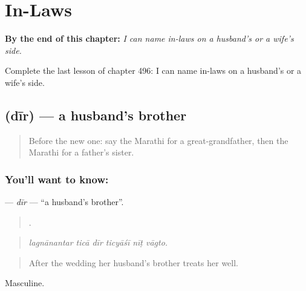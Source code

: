 
\chapter{In-Laws}
\label{ch:mr-in-laws}

\begin{chapteropening}
\textbf{By the end of this chapter:} \emph{I can name in-laws on a husband's or a wife's side.}

Complete the last lesson of chapter 496: I can name in-laws on a husband's or a wife's side.
\end{chapteropening}

\section[\texorpdfstring{\mr{दीर} (dīr)}{दीर (dīr)}]{ (dīr) — a husband's brother}

\label{lesson:MR-C496-dir}



\begin{quote}
Before the new one: say the Marathi for a great-grandfather, then the Marathi for a father's sister.
\end{quote}

\subsection*{You'll want to know: }
\textbf{} — \emph{dīr} — \textquotedblleft{}a husband's brother\textquotedblright{}.

\begin{quote}
     .
\end{quote}

\begin{quote}
\emph{lagnānantar ticā dīr ticyāśī nīṭ vāgto.}
\end{quote}

\begin{quote}
After the wedding her husband's brother treats her well.
\end{quote}

Masculine.

